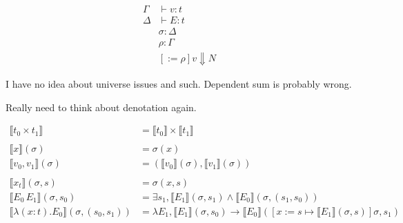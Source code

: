 \documentclass{scrartcl}
\DeclareMathOperator{\unit}{\textbf{I}}
\newcommand{\update}{\mathbin{:=}}
\begin{document}
\begin{center}

  \begin{align*}
  \Gamma & \vdash v \colon t \\
  \Delta & \vdash E \colon t \\
  & \sigma \colon \Delta \\
  & \rho \colon \Gamma \\
  & [:=\rho]v \Downarrow N
  \end{align*}

\end{center}

I have no idea about universe issues and such. Dependent sum is probably wrong.

Really need to think about denotation again.

\[
\begin{aligned}
  \llbracket t_0 \times t_1 \rrbracket & =\llbracket t_0 \rrbracket \times \llbracket t_1 \rrbracket \\
  \\
  \llbracket x \rrbracket(\sigma) & = \sigma(x) \\
  \llbracket v_0 , v_1 \rrbracket(\sigma) & =( \llbracket v_0 \rrbracket(\sigma) , \llbracket v_1 \rrbracket(\sigma) ) \\
  \\
  \llbracket x_t \rrbracket(\sigma, s) & = \sigma(x, s) \\
  \llbracket E_0 \, E_1 \rrbracket(\sigma, s_0) & = \exists s_1,  \llbracket E_1 \rrbracket (\sigma, s_1) \wedge \llbracket E_0 \rrbracket (\sigma, (s_1, s_0))\\
  \llbracket \lambda{} (x \colon t). E_0 \rrbracket(\sigma, (s_0, s_1)) & = \lambda{} E_1, \llbracket E_1 \rrbracket (\sigma, s_0) \rightarrow \llbracket E_0 \rrbracket ([x \update  s \mapsto \llbracket E_1 \rrbracket(\sigma, s)] \sigma, s_1) 
\end{aligned}
\]
\end{document}
